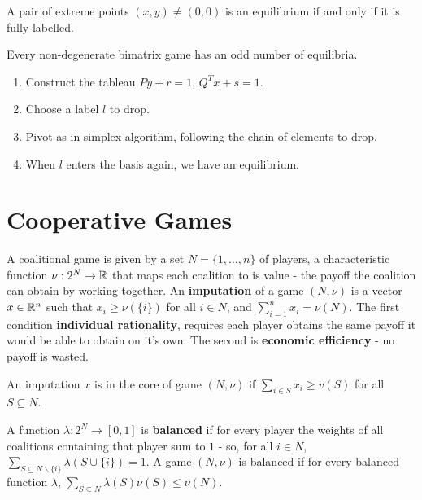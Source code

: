 \begin{thm}
  \label{a-2}
  A pair of extreme points $(x, y) \neq (0, 0)$ is an equilibrium if
  and only if it is fully-labelled.
\end{thm}

\begin{thm}
  \label{a-3}
  Every non-degenerate bimatrix game has an odd number of equilibria.
\end{thm}

\begin{thm}
  \begin{enumerate}
  \item Construct the tableau $Py + r = 1$, $Q^{T}x + s = 1$.
  \item Choose a label $l$ to drop.
  \item Pivot as in simplex algorithm, following the chain of elements
    to drop.
  \item When $l$ enters the basis again, we have an equilibrium.
  \end{enumerate}
\end{thm}

\section{Cooperative Games}
\label{sec:cooperative-games}

\begin{defn}
  \label{sec:cooperative-games-1}
  A coalitional game is given by a set $N = \{ 1, \dots, n \} $ of
  players, a characteristic function $\nu: 2^{N} \rightarrow \mathbb{R}$ that
  maps each coalition to is value - the payoff the coalition can obtain
  by working together.  An \textbf{imputation} of a game $(N, \nu)$ is a
  vector $x \in \mathbb{R}^{n}$ such that $x_{i} \geq \nu(\{ i \} )$ for all $i
  \in N$, and $\sum_{i=1}^{n} x_{i} = \nu(N)$.  The first condition
  \textbf{individual rationality}, requires each player obtains the
  same payoff it would be able to obtain on it's own.  The second is
  \textbf{economic efficiency} - no payoff is wasted.
\end{defn}


\begin{defn}
  \label{sec:cooperative-games-4}
  An imputation $x$ is in the core of game $(N, \nu)$ if $\sum_{i \in
    S}^{} x_{i} \geq v(S)$ for all $S \subseteq N$.
\end{defn}

\begin{defn}
  \label{sec:cooperative-games-2}
  A function $\lambda: 2^{N} \rightarrow [0, 1]$ is \textbf{balanced}
  if for every player the weights of all coalitions containing that
  player sum to $1$ - so, for all $i \in N$, $\sum_{S \subseteq N
    \backslash \{ i \} }^{} \lambda(S \cup \{ i \}) = 1$.  A game $(N,
  \nu)$ is balanced if for every balanced function $\lambda$, $\sum_{S
    \subseteq N}^{} \lambda(S) \nu(S) \leq \nu(N)$.
\end{defn}


